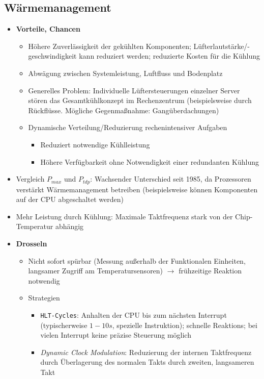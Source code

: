 \subsection{Wärmemanagement}
\begin{itemize}
	\item \textbf{Vorteile, Chancen}
	\begin{itemize}
		\item Höhere Zuverlässigkeit der gekühlten Komponenten; Lüfterlautstärke/-geschwindigkeit kann reduziert werden; reduzierte Kosten für die Kühlung
		\item Abwägung zwischen Systemleistung, Luftfluss und Bodenplatz
		\item Generelles Problem: Individuelle Lüftersteuerungen einzelner Server stören das Gesamtkühlkonzept im Rechenzentrum (beispielsweise durch Rückflüsse. Mögliche Gegenmaßnahme: Gangüberdachungen)
		\item Dynamische Verteilung/Reduzierung rechenintensiver Aufgaben
		\begin{itemize}
			\item Reduziert notwendige Kühlleistung
			\item Höhere Verfügbarkeit ohne Notwendigkeit einer redundanten Kühlung
		\end{itemize}
	\end{itemize}
	\item Vergleich \(P_{max}\) und \(P_{tdp}\): Wachsender Unterschied seit 1985, da Prozessoren verstärkt Wärmemanagement betreiben (beispielsweise können Komponenten auf der CPU abgeschaltet werden)
	\item Mehr Leistung durch Kühlung: Maximale Taktfrequenz stark von der Chip-Temperatur abhängig
	\item \textbf{Drosseln}
	\begin{itemize}
		\item Nicht sofort spürbar (Messung außerhalb der Funktionalen Einheiten, langsamer Zugriff am Temperatursensoren) \(\rightarrow\) frühzeitige Reaktion notwendig
		\item Strategien
		\begin{itemize}
			\item \texttt{HLT-Cycles}: Anhalten der CPU bis zum nächsten Interrupt (typischerweise \(1-10s\), spezielle Instruktion); schnelle Reaktions; bei vielen Interrupt keine präzise Steuerung möglich
			\item \textit{Dynamic Clock Modulation}: Reduzierung der internen Taktfrequenz durch Überlagerung des normalen Takts durch zweiten, langsameren Takt

\end{itemize}
\end{itemize}
\end{itemize}

